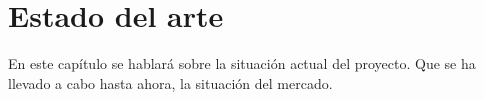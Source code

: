 \chapter{Estado del arte}
\label{cap:Estado del arte}

En este capítulo se hablará sobre la situación actual del proyecto.
Que se ha llevado a cabo hasta ahora, la situación del mercado.




